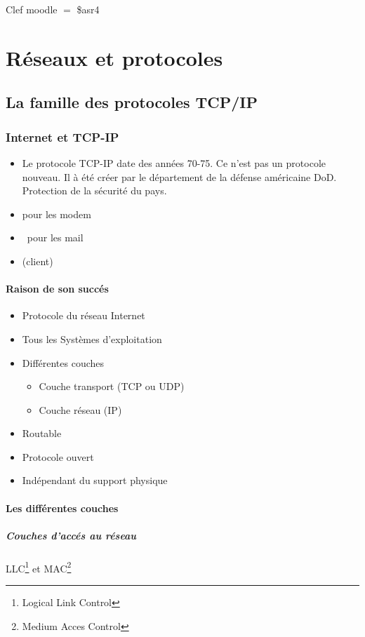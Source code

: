 \documentclass[12pt,a4paper,openany]{report}
\begin{document}
	\maketitle
	Clef moodle $=$ \$asr4
	\chapter{Réseaux et protocoles}
	\section{La famille des protocoles TCP/IP}
		\subsection{Internet et TCP-IP}
		\begin{itemize}
			\item Le protocole TCP-IP date des années 70-75. Ce n'est pas un protocole nouveau. Il à été créer par le 
			département de la défense américaine DoD. Protection de la sécurité du pays.
			\item {} pour les modem
			\item {} pour les mail
			\item {} (client)
		\end{itemize}

		\subsubsection{Raison de son succés}
		\begin{itemize}
			\item Protocole du réseau Internet
			\item Tous les Systèmes d'exploitation 
			\item Différentes couches
				\begin{itemize}
					\item Couche transport (TCP ou UDP)
					\item Couche réseau (IP)
				\end{itemize}
			\item Routable
			\item Protocole ouvert
			\item Indépendant du support physique
		\end{itemize}
		\subsubsection{Les différentes couches}
		\paragraph{Couches d'accés au réseau}
		LLC\footnote{Logical Link Control} et MAC\footnote{Medium Acces Control}\\
		
		
\end{document}
